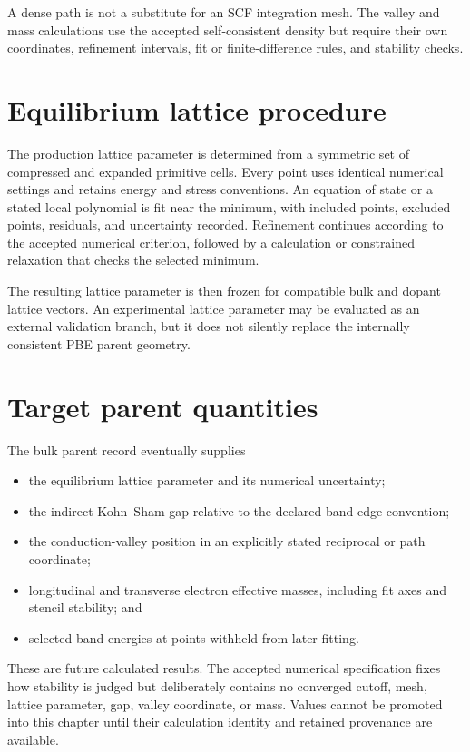 A dense path is not a substitute for an SCF integration mesh. The valley and
mass calculations use the accepted self-consistent density but require their
own coordinates, refinement intervals, fit or finite-difference rules, and
stability checks.

\section{Equilibrium lattice procedure}


The production lattice parameter is determined from a symmetric set of
compressed and expanded primitive cells. Every point uses identical numerical
settings and retains energy and stress conventions. An equation of state or a
stated local polynomial is fit near the minimum, with included points, excluded
points, residuals, and uncertainty recorded. Refinement continues according to
the accepted numerical criterion, followed by a calculation or constrained
relaxation that checks the selected minimum.

The resulting lattice parameter is then frozen for compatible bulk and dopant
lattice vectors. An experimental lattice parameter may be evaluated as an
external validation branch, but it does not silently replace the internally
consistent PBE parent geometry.

\section{Target parent quantities}


The bulk parent record eventually supplies

\begin{itemize}
  \item the equilibrium lattice parameter and its numerical uncertainty;
  \item the indirect Kohn--Sham gap relative to the declared band-edge
    convention;
  \item the conduction-valley position in an explicitly stated reciprocal or
    path coordinate;
  \item longitudinal and transverse electron effective masses, including fit
    axes and stencil stability; and
  \item selected band energies at points withheld from later fitting.
\end{itemize}

These are future calculated results. The accepted numerical specification fixes
how stability is judged but deliberately contains no converged cutoff, mesh,
lattice parameter, gap, valley coordinate, or mass. Values cannot be promoted
into this chapter until their calculation identity and retained provenance are
available.

